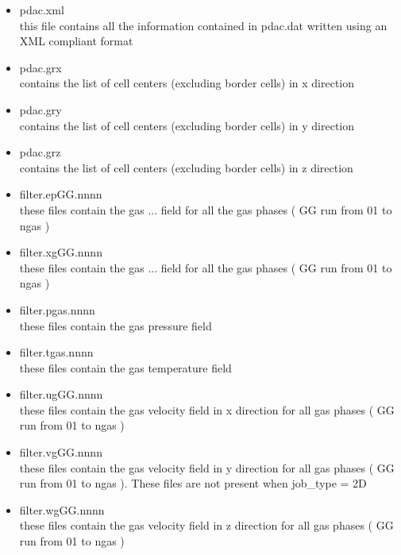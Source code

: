 \begin{itemize}

\item pdac.xml  \\
      this file contains all the information contained in pdac.dat
      written using an XML compliant format

\item pdac.grx \\
      contains the list of cell centers (excluding border cells) 
      in x direction

\item pdac.gry \\
      contains the list of cell centers (excluding border cells) 
      in y direction

\item pdac.grz \\
      contains the list of cell centers (excluding border cells) 
      in z direction

\item filter.epGG.nnnn \\
      these files contain the gas ... field for all the gas 
      phases ( GG run from 01 to ngas ) 

\item filter.xgGG.nnnn \\
      these files contain the gas ... field for all the gas 
      phases ( GG run from 01 to ngas ) 

\item filter.pgas.nnnn \\
      these files contain the gas pressure field 

\item filter.tgas.nnnn \\
      these files contain the gas temperature field 

\item filter.ugGG.nnnn \\
      these files contain the gas velocity field in x direction
      for all gas phases ( GG run from 01 to ngas )

\item filter.vgGG.nnnn \\
      these files contain the gas velocity field in y direction
      for all gas phases ( GG run from 01 to ngas ).
      These files are not present when job\_type = 2D

\item filter.wgGG.nnnn \\
      these files contain the gas velocity field in z direction
      for all gas phases ( GG run from 01 to ngas )


\end{itemize}
